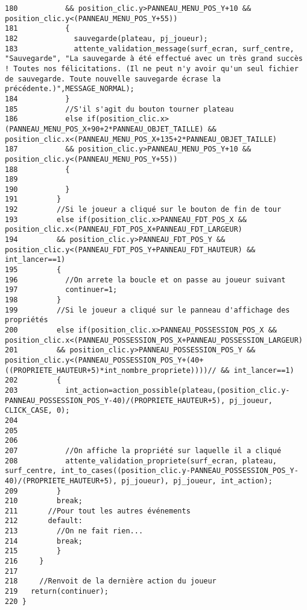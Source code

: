 \begin{Code}
\begin{verbatim}
180           && position_clic.y>PANNEAU_MENU_POS_Y+10 && position_clic.y<(PANNEAU_MENU_POS_Y+55))
181           {
182             sauvegarde(plateau, pj_joueur);
183             attente_validation_message(surf_ecran, surf_centre, "Sauvegarde", "La sauvegarde à été effectué avec un très grand succès ! Toutes nos félicitations. (Il ne peut n'y avoir qu'un seul fichier de sauvegarde. Toute nouvelle sauvegarde écrase la précédente.)",MESSAGE_NORMAL);
184           }
185           //S'il s'agit du bouton tourner plateau
186           else if(position_clic.x>(PANNEAU_MENU_POS_X+90+2*PANNEAU_OBJET_TAILLE) && position_clic.x<(PANNEAU_MENU_POS_X+135+2*PANNEAU_OBJET_TAILLE)
187           && position_clic.y>PANNEAU_MENU_POS_Y+10 && position_clic.y<(PANNEAU_MENU_POS_Y+55))
188           {
189 
190           }
191         }
192         //Si le joueur a cliqué sur le bouton de fin de tour
193         else if(position_clic.x>PANNEAU_FDT_POS_X && position_clic.x<(PANNEAU_FDT_POS_X+PANNEAU_FDT_LARGEUR)
194         && position_clic.y>PANNEAU_FDT_POS_Y && position_clic.y<(PANNEAU_FDT_POS_Y+PANNEAU_FDT_HAUTEUR) && int_lancer==1)
195         {
196           //On arrete la boucle et on passe au joueur suivant
197           continuer=1;
198         }
199         //Si le joueur a cliqué sur le panneau d'affichage des propriétés
200         else if(position_clic.x>PANNEAU_POSSESSION_POS_X && position_clic.x<(PANNEAU_POSSESSION_POS_X+PANNEAU_POSSESSION_LARGEUR)
201         && position_clic.y>PANNEAU_POSSESSION_POS_Y && position_clic.y<(PANNEAU_POSSESSION_POS_Y+(40+((PROPRIETE_HAUTEUR+5)*int_nombre_propriete))))// && int_lancer==1)
202         {
203           int_action=action_possible(plateau,(position_clic.y-PANNEAU_POSSESSION_POS_Y-40)/(PROPRIETE_HAUTEUR+5), pj_joueur, CLICK_CASE, 0);
204           
205           
206           
207           //On affiche la propriété sur laquelle il a cliqué
208           attente_validation_propriete(surf_ecran, plateau, surf_centre, int_to_cases((position_clic.y-PANNEAU_POSSESSION_POS_Y-40)/(PROPRIETE_HAUTEUR+5), pj_joueur), pj_joueur, int_action);
209         }
210         break;
211       //Pour tout les autres événements
212       default:
213         //On ne fait rien...
214         break;
215         }
216     }
217     
218     //Renvoit de la dernière action du joueur
219   return(continuer);
220 }
\end{verbatim}\end{Code}


